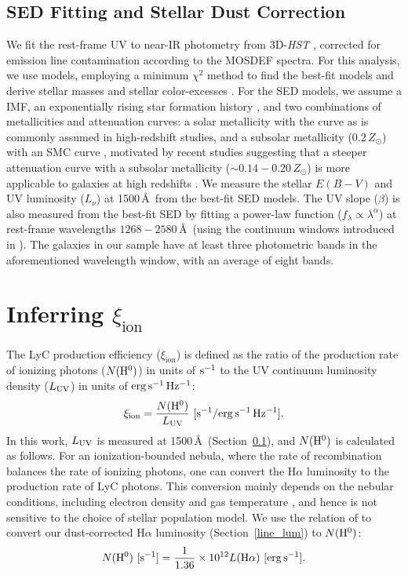 \documentclass[iop]{emulateapj}
\newcommand{\xiion}{\ensuremath{\xi_{\mathrm{ion}}}}
\newcommand{\halpha}{H\ensuremath{\alpha}}
\begin{document}
\subsection{SED Fitting and Stellar Dust Correction}
\label{sec:sed}
We fit the rest-frame UV to near-IR photometry from 3D-{\em HST} \citep{skelton14,momcheva16}, corrected for emission line contamination according to the MOSDEF spectra. For this analysis, we use \citet[][hereafter BC03]{bc03} models, employing a minimum $\chi^2$ method to find the best-fit models and derive stellar masses and stellar color-excesses \citep[see][]{reddy15}.
For the SED models, we assume a \citet{chabrier03} IMF, an exponentially rising star formation history \citep[which has been shown to best reproduce the observed SFRs at $z\sim 2$,][]{reddy12b}, and two combinations of metallicities and attenuation curves: a solar metallicity with the \citet{calzetti00} curve as is commonly assumed in high-redshift studies, and a subsolar metallicity (0.2\,$Z_{\odot}$) with an SMC curve \citep{gordon03}, motivated by recent studies suggesting that a steeper attenuation curve with a subsolar metallicity ($\sim 0.14-0.20\,Z_{\odot}$) is more applicable to galaxies at high redshifts \citep{capak15,bouwens16c,reddy17}.
We measure the stellar $E(B-V)$ and UV luminosity ($L_{\nu}$) at 1500\,\AA~from the best-fit SED models. The UV slope ($\beta$) is also measured from the best-fit SED by fitting a power-law function ($f_{\lambda}\propto \lambda^{\alpha}$) at rest-frame wavelengths $1268-2580$\,\AA~(using the continuum windows introduced in \citealt{calzetti94}). The galaxies in our sample have at least three photometric bands in the aforementioned wavelength window, with an average of eight bands.

\section{Inferring \xiion}
\label{sec:xi_meas}
The LyC production efficiency ({\xiion}) is defined as the ratio of the production rate of ionizing photons ($N({\rm H}^0)$) in units of ${\rm s^{-1}}$ to the UV continuum luminosity density ($L_{\rm UV}$) in units of ${\rm erg\,s^{-1}\,Hz^{-1}}$:
\begin{equation}
\xiion = \frac{N({\rm H}^0)}{L_{\rm UV}}~ {\rm [s^{-1}/erg\,s^{-1}\,Hz^{-1}]}.
\label{eq:xi}
\end{equation}
In this work, $L_{\rm UV}$ is measured at 1500\,\AA~(Section~\ref{sec:sed}), and $N({\rm H}^0)$ is calculated as follows.
For an ionization-bounded nebula, where the rate of recombination balances the rate of ionizing photons, one can convert the {\halpha} luminosity to the production rate of LyC photons. This conversion mainly depends on the nebular conditions, including electron density and gas temperature \citep{spitzer78,osterbrock89}, and hence is not sensitive to the choice of stellar population model.
We use the relation of \citet{leithererheckman95} to convert our dust-corrected {\halpha} luminosity (Section~\ref{line_lum}) to $N({\rm H}^0)$:
\begin{equation}
N({\rm H^0})~ {\rm [s^{-1}]} = \frac{1}{1.36} \times 10^{12} L({\rm \halpha})~ {\rm[erg\,s^{-1}]}.
\label{eq:n0}
\end{equation}
\end{document}
